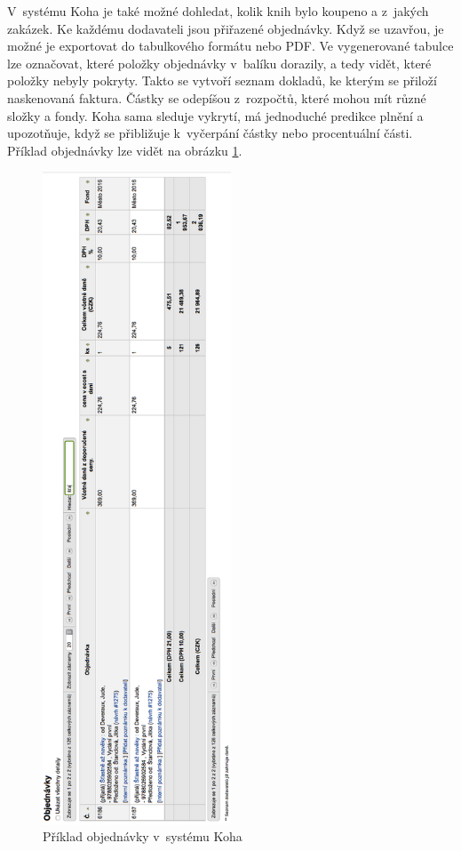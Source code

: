 \documentclass[
	11pt, oneside, printed, final, palatino, monochrome
	microtype,
	table,   %
	lof,     %
	lot     %
]{fithesis3}
\begin{document}
{V~systému Koha je také možné dohledat, kolik knih bylo koupeno a z~jakých zakázek. Ke každému dodavateli jsou přiřazené objednávky. Když se uzavřou, je možné je exportovat do tabulkového formátu nebo PDF. Ve vygenerované tabulce lze označovat, které položky objednávky v~balíku dorazily, a tedy vidět, které položky nebyly pokryty. Takto se vytvoří seznam dokladů, ke kterým se přiloží naskenovaná faktura. Částky se odepíšou z~rozpočtů, které mohou mít různé složky a fondy. Koha sama sleduje vykrytí, má jednoduché predikce plnění a upozotňuje, když se přibližuje k~vyčerpání částky nebo procentuální části. Příklad objednávky lze vidět na obrázku \ref{fig:objednavka}.

\begin{figure}
    \centering
    \includegraphics[width=0.5\textwidth]{resources/objednavka_left}
    \caption{Příklad objednávky v~systému Koha}
    \label{fig:objednavka}
\end{figure}

}
\end{document}
